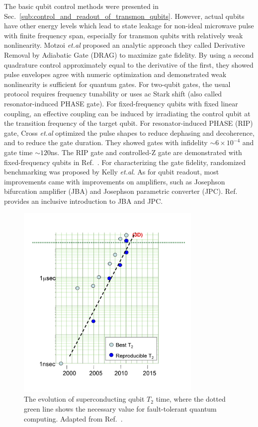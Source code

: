 \documentclass[%
groupedaddress,
showpacs,
 amsmath,amssymb,
 aps,
prb,
]{revtex4-1}
\newcommand{\etal}{\textit{et.al}}
\begin{document}
The basic qubit control methods were presented in Sec.~\ref{sub:control_and_readout_of_transmon_qubits}. However, actual qubits have other energy levels which lead to state leakage for non-ideal microwave pulse with finite frequency span, especially for transmon qubits with relatively weak nonlinearity. Motzoi \etal{} proposed an analytic approach they called Derivative Removal by Adiabatic
Gate (DRAG) to maximize gate fidelity\cite{Motzoi2009}. By using a second quadrature control approximately equal to the derivative of the first, they showed pulse envelopes agree with numeric optimization and demonstrated weak nonlinearity is sufficient for quantum gates. For two-qubit gates, the usual protocol\cite{DiCarlo2009} requires frequency tunability or uses ac Stark shift\cite{Majer2007} (also called resonator-induced PHASE gate). For fixed-frequency qubits with fixed linear coupling, an effective coupling can be induced by irradiating the control qubit at the transition frequency of the target qubit\cite{Rigetti2010}. For resonator-induced PHASE (RIP) gate, Cross \etal{} optimized the pulse shapes to reduce dephasing and decoherence, and to reduce the gate duration\cite{Cross2015}. They showed gates with infidelity $\sim 6\times 10^{-4}$ and gate time $\sim 120$ns. The RIP gate and controlled-Z gate are demonstrated with fixed-frequency qubits in Ref.~. For characterizing the gate fidelity, randomized benchmarking was proposed by Kelly \etal{}\cite{Kelly2014}. As for qubit readout, most improvements came with improvements on amplifiers, such as Josephson bifurcation amplifier (JBA)\cite{Siddiqi2004} and Josephson parametric converter (JPC)\cite{Bergeal2010}. Ref.~ provides an inclusive introduction to JBA and JPC.




            \begin{figure}[h]
                \centering
                \includegraphics[width=3.5in]{review/SCQubitCoherence.png}
                \caption{The evolution of superconducting qubit $T_2$ time, where the dotted green line shows the necessary value for fault-tolerant quantum computing. Adapted from Ref.~.}
                \label{fig:SCQubitCoherence}
            \end{figure}
\end{document}
